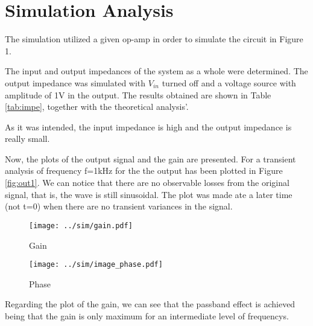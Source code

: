 \section{Simulation Analysis} \label{sec:simulation}

The simulation utilized a given op-amp in order to simulate the circuit in Figure 1. 

The input and output impedances of the system as a whole were determined. The output impedance was simulated with $V_{in}$ turned off and a voltage source with amplitude of 1V in the output. The results obtained are shown in Table \ref{tab:impe}, together with the theoretical analysis'.

\par

As it was intended, the input impedance is high and the output impedance is really small.
\par
Now, the plots of the output signal and the gain are presented. For a transient analysis of frequency f=1kHz for the the output has been plotted in Figure \ref{fig:out1}. We can notice that there are no observable losses from the original signal, that is, the wave is still sinusoidal. The plot was made ate a later time (not t=0) when there are no transient variances in the signal.



\begin{figure}[H] \centering
  \texttt{[image: ../sim/gain.pdf]}
  \caption{Gain}
  \label{fig:gain_simulation}
\end{figure}

\begin{figure}[H] \centering
  \texttt{[image: ../sim/image\_phase.pdf]}
  \caption{Phase}
  \label{fig:phase_simulation}
\end{figure}

Regarding the plot of the gain, we can see that the passband effect is achieved being that the gain is only maximum for an intermediate level of frequencys.

